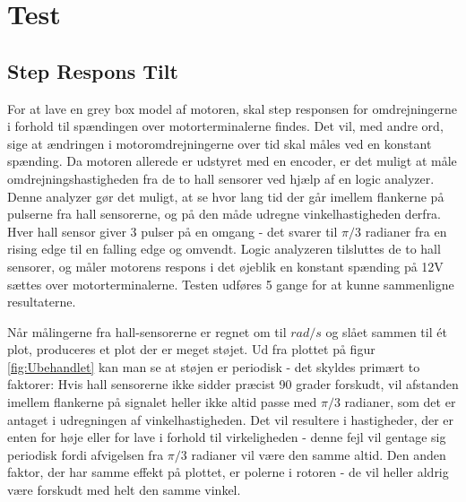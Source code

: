 \section{Test}

\subsection{Step Respons Tilt}

For at lave en grey box model af motoren, skal step responsen for omdrejningerne i forhold til spændingen over motorterminalerne findes. Det vil, med andre ord, sige at ændringen i motoromdrejningerne over tid skal måles ved en konstant spænding. Da motoren allerede er udstyret med en encoder, er det muligt at måle omdrejningshastigheden fra de to hall sensorer ved hjælp af en logic analyzer. Denne analyzer gør det muligt, at se hvor lang tid der går imellem flankerne på pulserne fra hall sensorerne, og på den måde udregne vinkelhastigheden derfra. 
Hver hall sensor giver 3 pulser på en omgang - det svarer til $\pi/3$ radianer fra en rising edge til en falling edge og omvendt. Logic analyzeren tilsluttes de to hall sensorer, og måler motorens respons i det øjeblik en konstant spænding på 12V sættes over motorterminalerne. Testen udføres 5 gange for at kunne sammenligne resultaterne. 

Når målingerne fra hall-sensorerne er regnet om til $rad/s$ og slået sammen til ét plot, produceres et plot der er meget støjet. Ud fra plottet på figur \ref{fig:Ubehandlet} kan man se at støjen er periodisk - det skyldes primært to faktorer: Hvis hall sensorerne ikke sidder præcist 90 grader forskudt, vil afstanden imellem flankerne på signalet heller ikke altid passe med $\pi/3$ radianer, som det er antaget i udregningen af vinkelhastigheden. Det vil resultere i hastigheder, der er enten for høje eller for lave i forhold til virkeligheden - denne fejl vil gentage sig periodisk fordi afvigelsen fra $\pi/3$ radianer vil være den samme altid. Den anden faktor, der har samme effekt på plottet, er polerne i rotoren - de vil heller aldrig være forskudt med helt den samme vinkel.

